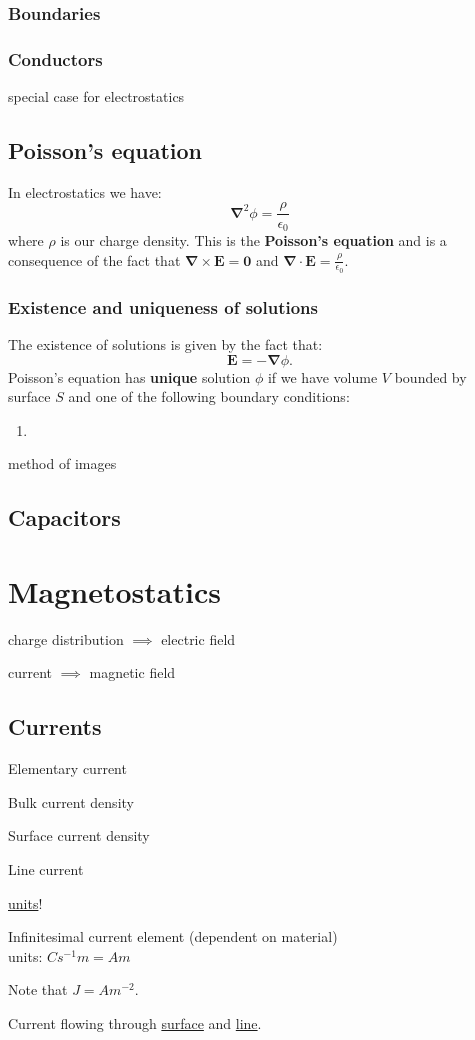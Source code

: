 \documentclass{article}
\begin{document}
\subsubsection{Boundaries}

\subsubsection{Conductors}
special case for electrostatics

\newpage

\subsection{Poisson's equation}
In electrostatics we have:
$$\boldsymbol{\nabla}^2\phi=\frac{\rho}{\epsilon_0}$$
where $\rho$ is our charge density. This is the \textbf{Poisson's equation}
and is a consequence of the fact that
$\boldsymbol{\nabla}\times\boldsymbol{E}=\boldsymbol{0}$ and
$\boldsymbol{\nabla}\cdot\boldsymbol{E}=\displaystyle\frac{\rho}{\epsilon_0}$.

\subsubsection{Existence and uniqueness of solutions}
The existence of solutions is given by the fact that:
$$\boldsymbol{E}=-\boldsymbol{\nabla}\phi.$$
Poisson's equation has \textbf{unique} solution $\phi$
if we have volume $V$ bounded by surface $S$
and one of the following boundary conditions:
\begin{enumerate}
    \item 
\end{enumerate}

method of images

\subsection{Capacitors}

\newpage

\section{Magnetostatics}

charge distribution $\implies$ electric field

current $\implies$ magnetic field

\subsection{Currents}

Elementary current

Bulk current density

Surface current density

Line current

\underline{units}!

Infinitesimal current element (dependent on material)\\
units: $Cs^{-1}m=Am$

Note that $J=Am^{-2}$.

Current flowing through \underline{surface} and \underline{line}.
\end{document}
